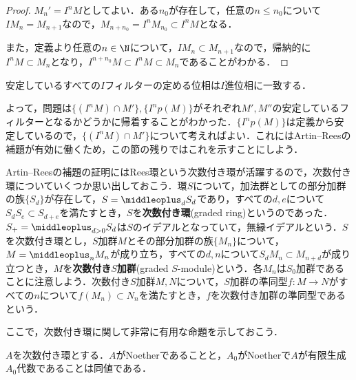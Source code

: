 \begin{proof}
	$M_n'=I^nM$としてよい．ある$n_0$が存在して，任意の$n\leq n_0$について$IM_n=M_{n+1}$なので，$M_{n+n_0}=I^nM_{n_0}\subset I^nM$となる．
	
	また，定義より任意の$n\in\N$について，$IM_n\subset M_{n+1}$なので，帰納的に$I^nM\subset M_n$となり，$I^{n+n_0}M\subset I^nM\subset M_n$であることがわかる．
\end{proof}

\begin{cor}
	安定しているすべての$I$フィルターの定める位相は$I$進位相に一致する．
\end{cor}

よって，問題は$\{(I^nM)\cap M'\},\{I^n p(M)\}$がそれぞれ$M',M''$の安定しているフィルターとなるかどうかに帰着することがわかった．$\{I^n p(M)\}$は定義から安定しているので，$\{(I^nM)\cap M'\}$について考えればよい．これにはArtin--Reesの補題が有効に働くため，この節の残りではこれを示すことにしよう．

Artin--Reesの補題の証明にはRees環という次数付き環が活躍するので，次数付き環についていくつか思い出しておこう．環$S$について，加法群としての部分加群の族$\{S_d\}$が存在して，$S=\middleoplus_d S_d$であり，すべての$d,e$について$S_dS_e\subset S_{d+e}$を満たすとき，$S$を\textbf{次数付き環}(graded ring)というのであった．$S_+=\middleoplus_{d>0}S_d$は$S$のイデアルとなっていて，無縁イデアルという．$S$を次数付き環とし，$S$加群$M$とその部分加群の族$\{M_n\}$について，$M=\middleoplus_n M_n$が成り立ち，すべての$d,n$について$S_dM_n\subset M_{n+d}$が成り立つとき，$M$を\textbf{次数付き}$S$\textbf{加群}(graded $S$-module)という．各$M_n$は$S_0$加群であることに注意しよう．次数付き$S$加群$M,N$について，$S$加群の準同型$f:M\to N$がすべての$n$について$f(M_n)\subset N_n$を満たすとき，$f$を次数付き加群の準同型であるという．

ここで，次数付き環に関して非常に有用な命題を示しておこう．

\begin{prop}\label{prop:次数付き環のNoether性}
	$A$を次数付き環とする．$A$がNoetherであることと，$A_0$がNoetherで$A$が有限生成$A_0$代数であることは同値である．
\end{prop}

